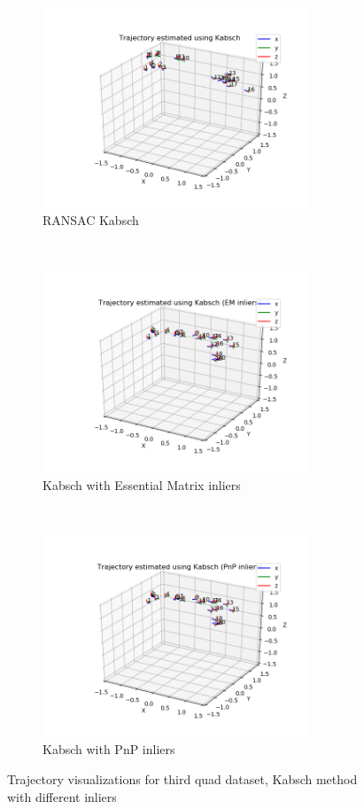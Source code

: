 \documentclass[12pt,a4paper]{article}
\begin{document}
\begin{figure}[h]
\begin{subfigure}[t]{\textwidth}
  \centering
    \includegraphics[width=80mm]{../quad/basic-reg-saves/rtrj_d_40.png}
  \caption{RANSAC Kabsch}
  \end{subfigure}%
  \\
  \begin{subfigure}[t]{0.5\textwidth}
  \centering
    \includegraphics[width=80mm]{../quad/basic-reg-saves/rtrj_de_40.png}
  \caption{Kabsch with Essential Matrix inliers}
  \end{subfigure}%
  ~
  \begin{subfigure}[t]{0.5\textwidth}
  \centering
    \includegraphics[width=80mm]{../quad/basic-reg-saves/rtrj_dp_40.png}
  \caption{Kabsch with PnP inliers}
  \end{subfigure}
  \caption{Trajectory visualizations for third quad dataset, Kabsch method with different inliers}
  \label{f: quad3 kabsch}
\end{figure}







\end{document}
